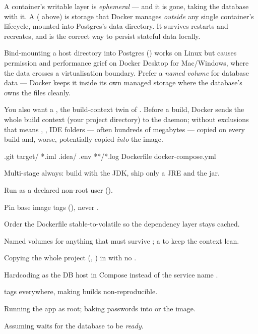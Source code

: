  A container's writable layer is \emph{ephemeral} ---  and it is gone, taking the database with it. A  ( above) is storage that Docker manages \emph{outside} any single container's lifecycle, mounted into Postgres's data directory. It survives restarts and recreates, and is the correct way to persist stateful data locally.

\begin{dbinsight}
Bind-mounting a host directory into Postgres () works on Linux but causes permission and performance grief on Docker Desktop for Mac/Windows, where the data crosses a virtualisation boundary. Prefer a \emph{named volume} for database data --- Docker keeps it inside its own managed storage where the database's  owns the files cleanly.
\end{dbinsight}

You also want a , the build-context twin of . Before a build, Docker sends the whole build context (your project directory) to the daemon; without exclusions that means , , IDE folders --- often hundreds of megabytes --- copied on every build and, worse, potentially copied \emph{into} the image.

\begin{propsbox}[.dockerignore]
.git
target/
*.iml
.idea/
.env
**/*.log
Dockerfile
docker-compose.yml
\end{propsbox}

\begin{bestpractices}
\begin{wbitem}
  \item Multi-stage always: build with the JDK, ship only a JRE and the jar.
  \item Run as a declared non-root user ().
  \item Pin base image tags (), never .
  \item Order the Dockerfile stable-to-volatile so the dependency layer stays cached.
  \item Named volumes for anything that must survive ; a  to keep the context lean.
\end{wbitem}
\end{bestpractices}
\begin{mistakes}
\begin{wbitem}
  \item Copying the whole project (, ) in with no .
  \item Hardcoding  as the DB host in Compose instead of the service name .
  \item {} tags everywhere, making builds non-reproducible.
  \item Running the app as root; baking passwords into  or the image.
  \item Assuming  waits for the database to be \emph{ready}.
\end{wbitem}
\end{mistakes}


